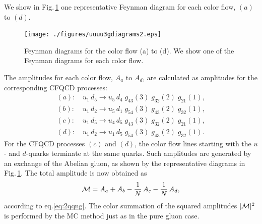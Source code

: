 \documentclass[a4paper,11pt]{article}
\begin{document}
We show in Fig.\,\ref{fig:abcd} one representative Feynman diagram for
each color flow, $(a)$ to $(d)$.
\begin{figure}
\begin{center}
\texttt{[image: ./figures/uuuu3gdiagrams2.eps]}
\caption{Feynman diagrams for the color flow (a) to (d). We show one of the
 Feynman diagrams for each color flow.}
\label{fig:abcd}
\end{center}
\end{figure}
The amplitudes for each color flow, $A_a$ to $A_d$, are calculated as
amplitudes for the corresponding CFQCD processes:
\begin{subequations}
\begin{align}
 (a):&\,u_1\,d_5\rightarrow u_5\,d_4 \;g_{43}(3) \;g_{32}(2) \;g_{21}(1),\\
 (b):&\,u_1\,d_2\rightarrow u_5\,d_1 \;g_{54}(3) \;g_{43}(2) \;g_{32}(1),\\
 (c):&\,u_1\,d_5\rightarrow u_4\,d_5 \;g_{43}(3) \;g_{32}(2) \;g_{21}(1),\\
 (d):&\,u_1\,d_2\rightarrow u_1\,d_5 \;g_{54}(3) \;g_{43}(2) \;g_{32}(1).
\end{align}
\end{subequations}
For the CFQCD processes $(c)$ and $(d)$, the color flow lines starting
with the $u$- and $d$-quarks terminate at the same quarks. Such amplitudes are generated
by an exchange of the Abelian gluon, as shown by the
representative diagrams in Fig.\,\ref{fig:abcd}. The total amplitude is
now obtained as
\begin{equation}
 {\cal M}=A_a+A_b-\frac{1}{N}\,A_c-\frac{1}{N}\,A_d,
\end{equation}
according to eq.\eqref{eq:2qqng}. The color summation of the squared
amplitudes $|{\cal M}|^2$ is performed by the MC method just as in the pure gluon case.
\end{document}
